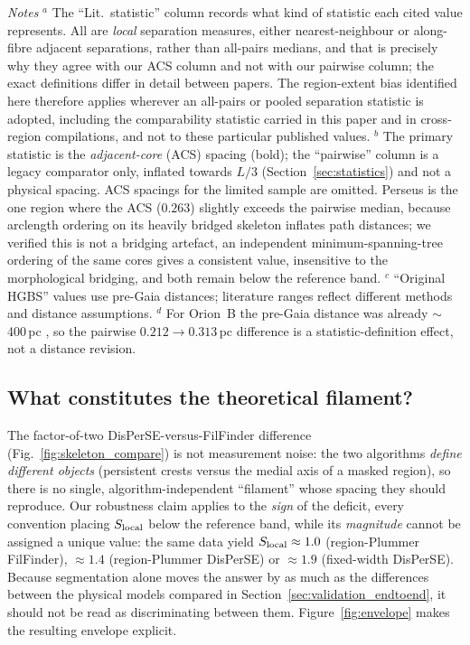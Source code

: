 \documentclass[usenatbib,twoside,twocolumn]{mnras}
\begin{document}
\begin{table}
\vspace{0.1in}
\footnotesize
\emph{Notes} $^{a}$ The ``Lit.\ statistic'' column records what kind of statistic each cited value represents. All are \emph{local} separation measures, either nearest-neighbour or along-fibre adjacent separations, rather than all-pairs medians, and that is precisely why they agree with our ACS column  and not with our pairwise column; the exact definitions differ in detail between papers. The region-extent bias identified here therefore applies wherever an all-pairs or pooled separation statistic is adopted, including the comparability statistic carried in this paper and in cross-region compilations, and not to these particular published values. $^{b}$ The primary statistic is the \emph{adjacent-core} (ACS) spacing (bold); the ``pairwise'' column is a legacy comparator only, inflated towards $L/3$ (Section~\ref{sec:statistics}) and not a physical spacing. ACS spacings for the limited sample are omitted. Perseus is the one region where the ACS ($0.263$) slightly exceeds the pairwise median, because arclength ordering on its heavily bridged skeleton inflates path distances; we verified this is not a bridging artefact, an independent minimum-spanning-tree ordering of the same cores gives a consistent value, insensitive to the morphological bridging, and both remain below the reference band. $^{c}$ ``Original HGBS'' values use pre-Gaia distances; literature ranges reflect different methods and distance assumptions. $^{d}$ For Orion~B the pre-Gaia distance was already $\sim$400\,pc \citep{Konyves2020}, so the pairwise $0.212\to0.313$\,pc difference is a statistic-definition effect, not a distance revision.
\end{table}

\subsection{What constitutes the theoretical filament?}
\label{sec:whatfilament}

The factor-of-two DisPerSE-versus-FilFinder difference (Fig.~\ref{fig:skeleton_compare}) is not measurement noise: the two algorithms \emph{define different objects} (persistent crests versus the medial axis of a masked region), so there is no single, algorithm-independent ``filament'' whose spacing they should reproduce. Our robustness claim applies to the \emph{sign} of the deficit, every convention placing $S_{\rm local}$ below the reference band, while its \emph{magnitude} cannot be assigned a unique value: the same data yield $S_{\rm local}\approx1.0$ (region-Plummer FilFinder), $\approx1.4$ (region-Plummer DisPerSE) or $\approx1.9$ (fixed-width DisPerSE). Because segmentation alone moves the answer by as much as the differences between the physical models compared in Section~\ref{sec:validation_endtoend}, it should not be read as discriminating between them. Figure~\ref{fig:envelope} makes the resulting envelope explicit.
\end{document}
